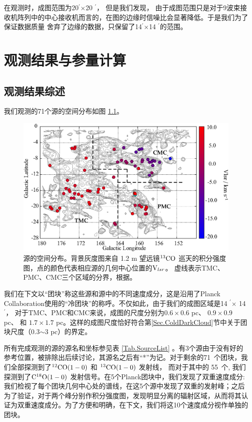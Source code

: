 \documentclass[UTF8, nocolorlinks]{pkuthss}
\newcommand{\cob}{$\rm ^{13}CO$ }
\newcommand{\coaa}{$\rm^{12}CO(1-0)$ }
\newcommand{\cobb}{$\rm^{13}CO(1-0)$ }
\newcommand{\cocc}{$\rm C^{18}O(1-0)$ }
\newcommand{\multi}{$\times$}
\newcommand{\vlsr}{${\rm V } _{lsr}$}
\newcommand{\arcmin}{$^{\prime}$}
\newcommand{\numsou}{71\ }
\newcommand{\numcocc}{55\ }
\begin{document}
        在观测时，成图范围为20\arcmin \multi 20 \arcmin ， 但是我们发现， 由于成图范围只是对于9波束接收机阵列中的中心接收机而言的，在图的边缘时信噪比会显著降低。于是我们为了保证数据质量 舍弃了边缘的数据，只保留了14\arcmin \multi 14 \arcmin 的范围。

\chapter{观测结果与参量计算}

	\section{观测结果综述}
		我们观测的71个源的空间分布如图 \ref{Fig.SpatialDistribution}。

		\begin{figure}[H]
		\centering
		\includegraphics[totalheight=72mm]{img_plot/SpatiaDist_Velocity_Overlay.eps}
		\caption{\small 源的空间分布。背景灰度图来自 1.2 m 望远镜\cob 巡天的积分强度图\supercite{2001ApJ...547..792D}，点的颜色代表相应源的几何中心位置的\vlsr 。
		虚线表示TMC、PMC、CMC三个区域的分界，根据\parencite{2010A&A...512A..67L}。
		\label{Fig.SpatialDistribution}}
		\end{figure}

		我们在下文以“团块”称这些源和源中的不同速度成分，这是沿用了Planck Collaboration使用的“冷团块”的称呼\supercite{2011A&A...536A..23P}。不仅如此，由于我们的成图区域是14 \arcmin $\times$ 14 \arcmin ， 对于TMC、PMC和CMC来说，成图的尺度分别为$0.6\times0.6$ pc、 $0.9\times0.9$ pc、 和 $1.7\times1.7$ pc。这样的成图尺度恰好符合第\ref{Sec.ColdDarkCloud}节中关于团块尺度（0.3$\sim$3 pc）的界定。

		所有完成观测的源的源名和坐标参见表 \ref{Tab.SourceList} 。有3个源由于没有好的参考位置，被排除出后续讨论，其源名之后有“*”为记。对于剩余的\numsou 个团块，我们全部探测到了\coaa  和 \cobb 发射线， 而对于其中的 \numcocc 个, 我们探测到了\cocc 发射信号。在5个Planck团块中，我们发现了双重速度成分: 我们检视了每个团块几何中心处的谱线，在这5个源中发现了双重的发射峰；之后为了验证，对于两个峰分别作积分强度图，发现明显分离的辐射区域，从而将其认证为双重速度成分。为了方便和明确，在下文，我们将这10个速度成分视作单独的团块。
\end{document}
